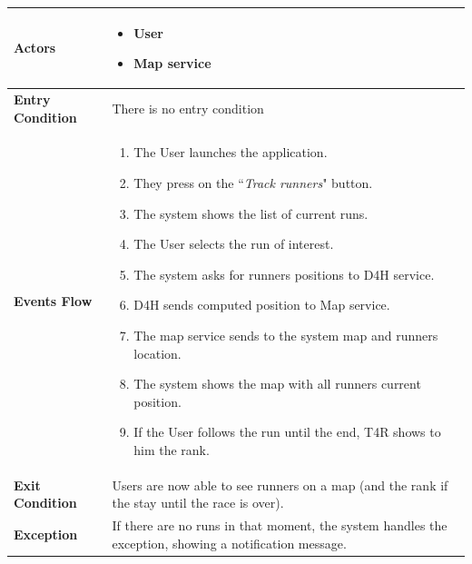             \begin{table}[H]
            	\centering
                
                \begin{tabular}{|p{3cm}|p{8.2cm}|}
                    \hline
                    \textbf{Actors} & \begin{itemize}
                                            \item User
                                            \item Map service
                                        \end{itemize} \\
                     \hline
                    \textbf{Entry Condition} & There is no entry condition \\
                     \hline
                    \textbf{Events Flow} & \begin{enumerate}
                                                \item The User launches the application.
                                                \item They press on the ``\emph{Track runners}" button.
                                                \item The system shows the list of current runs.
                                                \item The User selects the run of interest.
                                                \item The system asks for runners positions to D4H service.
                                                \item D4H sends computed position to Map service.
                                                \item The map service sends to the system map and runners location.
                                                \item The system shows the map with all runners current position.
                                                \item If the User follows the run until the end, T4R shows to him the rank.
                                            \end{enumerate} \\
                     \hline
                    \textbf{Exit Condition} & Users are now able to see runners on a map (and the rank if the stay until the race is over). \\
                     \hline
                    \textbf{Exception} & If there are no runs in that moment, the system handles the exception, showing a notification message. \\
                     \hline
                \end{tabular}  
            \end{table}
            
